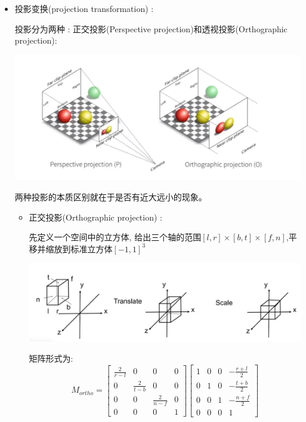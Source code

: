 \documentclass[UTF8]{ctexbook}
\begin{document}
{{{{\begin{itemize}
          \item {
                投影变换(projection transformation) :

                投影分为两种 : 正交投影(Perspective projection)和透视投影(Orthographic projection):

                \includegraphics[scale=0.5]{resources/twoProjectionTransformation.png}

                两种投影的本质区别就在于是否有近大远小的现象。

                \begin{itemize}
                  \item {
                        正交投影(Orthographic projection) :

                        先定义一个空间中的立方体, 给出三个轴的范围$[l,r]\times[b,t]\times[f,n]$,平移并缩放到标准立方体$[-1,1]^3$

                        \includegraphics[scale=0.5]{resources/OrthographicProjection.png}

                        矩阵形式为:$$
                          M_{ortho} = \left[\begin{matrix}
                              \frac{2}{r - l} & 0               & 0               & 0 \\
                              0               & \frac{2}{t - b} & 0               & 0 \\
                              0               & 0               & \frac{2}{n - f} & 0 \\
                              0               & 0               & 0               & 1
                            \end{matrix}\right]
                          \left[\begin{matrix}
                              1 & 0 & 0 & -\frac{r + l}{2} \\
                              0 & 1 & 0 & -\frac{t + b}{2} \\
                              0 & 0 & 1 & -\frac{n + f}{2} \\
                              0 & 0 & 0 & 1
                            \end{matrix}\right]
                        $$

}
\end{itemize}}
\end{itemize}}}}}
\end{document}
